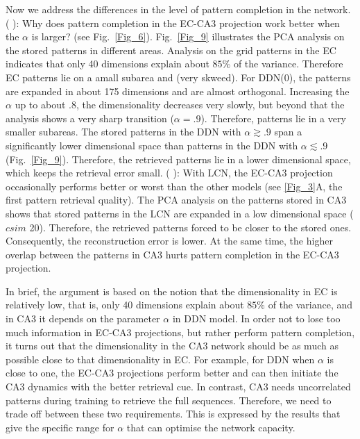 \documentclass[utf8]{frontiersSCNS} %
\newcommand{\RN}[1]{%
  \textup{\uppercase\expandafter{\romannumeral#1}}%
}
\begin{document}
Now we address the differences in the level of pattern completion in the network. 
%
(\RN{1}): Why does pattern completion in the EC-CA3 projection work better when the $\alpha$ is larger? (see Fig.~\ref{Fig_6}). 
%
Fig.~\ref{Fig_9} illustrates the PCA analysis on the stored patterns in different areas. Analysis on the grid patterns in the EC indicates that only 40 dimensions explain about $85 \%$ of the variance. Therefore EC patterns lie on a amall subarea and (very skweed). For DDN(0), the patterns are expanded in about 175 dimensions and are almost orthogonal.
Increasing the $\alpha$ up to about .8, the dimensionality decreases very slowly, but beyond that the analysis shows a very sharp transition ($\alpha = .9$). Therefore, patterns lie in a very smaller subareas. 
%
The stored patterns in the DDN with $\alpha \gtrsim .9$ span a significantly lower dimensional space than patterns in the DDN with  $\alpha \lesssim .9$ (Fig.~\ref{Fig_9}). 
%
Therefore, the retrieved patterns lie in a lower dimensional space, which keeps the retrieval error small.
%
(\RN{2}): 
With LCN, the EC-CA3 projection occasionally performs better or worst than the other models (see \ref{Fig_3}A, the first pattern retrieval quality). The PCA analysis on the patterns stored in CA3 shows that stored patterns in the LCN  are expanded in a low dimensional space ($csim$ 20). Therefore, the retrieved patterns forced to be closer to the stored ones. Consequently, the reconstruction error is lower. At the same time, the higher overlap between the patterns in CA3 hurts pattern completion in the EC-CA3 projection. 

In brief, the argument is based on the notion that the dimensionality in EC is relatively low, that is, only 40 dimensions explain about $85 \%$ of the variance, and in CA3 it depends on the parameter $\alpha$ in DDN model. In order not to lose too much information in EC-CA3 projections, but rather perform pattern completion, it turns out that the dimensionality in the CA3 network should be as much as possible close to that dimensionality in EC. For example, for DDN when $\alpha$ is close to one, the EC-CA3 projections perform better and can then initiate the CA3 dynamics with the better retrieval cue. In contrast, CA3 needs uncorrelated patterns during training to retrieve the full sequences.  Therefore, we need to trade off between these two requirements. This is expressed by the results that give the specific range for $\alpha$ that can optimise the network capacity. 
%
\end{document}
